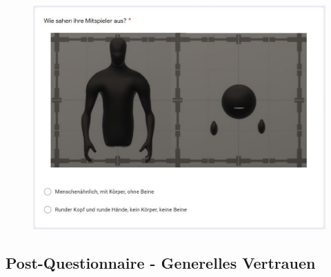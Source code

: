 \documentclass[a4paper,11pt]{article}%
\renewcommand{\\}{\vspace*{0.5\baselineskip} \newline}
\begin{document}
	\begin{figure}[H]
	\centering
		\begin{footnotesize}
			\includegraphics[scale=0.6]{Abbildungen/Fragebogen/Post-Questionnaire/PQM1}
		\end{footnotesize}
	\end{figure}	

\newpage

\subsection{Post-Questionnaire - Generelles Vertrauen}
\label{Post-Questionnaire - Generelles Vertrauen}
\end{document}

